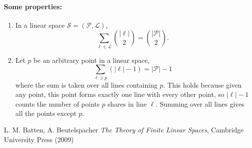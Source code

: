 \documentclass[12pt]{article}
\begin{document}
\paragraph{Some properties:}
\begin{enumerate}
\item In a linear space $\mathscr{S}=(\mathcal{P},\mathcal{L})$, 
$$\sum_{\ell \in \mathcal{L}} \binom{|\ell|}{2} = \binom{|\mathcal{P}|}{2}.$$

\item Let $p$ be an arbitrary point in a linear space, 
\[\sum_{\ell \ni p} (|\ell| - 1) = |\mathcal{P}| - 1\]
where the sum is taken over all lines containing $p$. This holds because given any point, this point forms exactly one line with every other point, so $|\ell| - 1$ counts the number of points $p$ shares in line $\ell$. Summing over all lines gives all the points except $p$.
\end{enumerate}

\begin{thebibliography}{7}
 L. M. Batten, A. Beutelspacher {\it The Theory of Finite Linear Spaces}, Cambridge University Press (2009)
\end{thebibliography}
\end{document}
